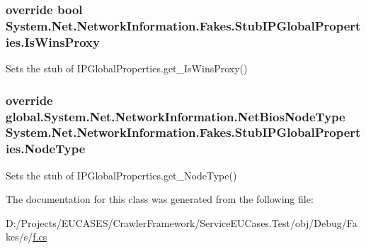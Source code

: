 \hypertarget{class_system_1_1_net_1_1_network_information_1_1_fakes_1_1_stub_i_p_global_properties_a0fb181a577b974ab892e7da0da84ccd8}{
\subsubsection[{Is\-Wins\-Proxy}]{\setlength{\rightskip}{0pt plus 5cm}override bool System.\-Net.\-Network\-Information.\-Fakes.\-Stub\-I\-P\-Global\-Properties.\-Is\-Wins\-Proxy\hspace{0.3cm}{\ttfamily [get]}}}\label{class_system_1_1_net_1_1_network_information_1_1_fakes_1_1_stub_i_p_global_properties_a0fb181a577b974ab892e7da0da84ccd8}


Sets the stub of I\-P\-Global\-Properties.\-get\-\_\-\-Is\-Wins\-Proxy()

\hypertarget{class_system_1_1_net_1_1_network_information_1_1_fakes_1_1_stub_i_p_global_properties_a6340c7d52de76d7e6a6e470a432ac49a}{
\subsubsection[{Node\-Type}]{\setlength{\rightskip}{0pt plus 5cm}override global.\-System.\-Net.\-Network\-Information.\-Net\-Bios\-Node\-Type System.\-Net.\-Network\-Information.\-Fakes.\-Stub\-I\-P\-Global\-Properties.\-Node\-Type\hspace{0.3cm}{\ttfamily [get]}}}\label{class_system_1_1_net_1_1_network_information_1_1_fakes_1_1_stub_i_p_global_properties_a6340c7d52de76d7e6a6e470a432ac49a}


Sets the stub of I\-P\-Global\-Properties.\-get\-\_\-\-Node\-Type()



The documentation for this class was generated from the following file\-:\begin{DoxyCompactItemize}
\item 
D\-:/\-Projects/\-E\-U\-C\-A\-S\-E\-S/\-Crawler\-Framework/\-Service\-E\-U\-Cases.\-Test/obj/\-Debug/\-Fakes/s/\hyperlink{s_2f_8cs}{f.\-cs}\end{DoxyCompactItemize}

